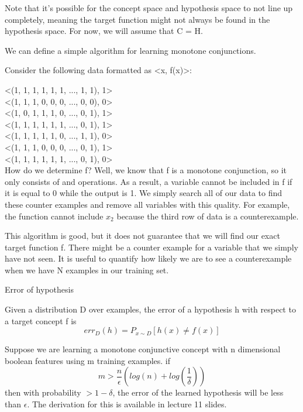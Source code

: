 Note that it's possible for the concept space and hypothesis space to not line up completely, meaning the target function might not always be found in the hypothesis space. For now, we will assume that C = H.

\hr

We can define a simple algorithm for learning monotone conjunctions.

Consider the following data formatted as <x, f(x)>:

<(1, 1, 1, 1, 1, 1, ..., 1, 1), 1> \\
<(1, 1, 1, 0, 0, 0, ..., 0, 0), 0> \\
<(1, 0, 1, 1, 1, 0, ..., 0, 1), 1> \\
<(1, 1, 1, 1, 1, 1, ..., 0, 1), 1> \\
<(1, 1, 1, 1, 1, 0, ..., 1, 1), 0> \\
<(1, 1, 1, 0, 0, 0, ..., 0, 1), 1> \\
<(1, 1, 1, 1, 1, 1, ..., 0, 1), 0> \\

How do we determine f? Well, we know that f is a monotone conjunction, so it only consists of and operations. As a result, a variable cannot be included in f if it is equal to 0 while the output is 1. We simply search all of our data to find these counter examples and remove all variables with this quality. For example, the function cannot include $x_2$ because the third row of data is a counterexample.

This algorithm is good, but it does not guarantee that we will find our exact target function f. There might be a counter example for a variable that we simply have not seen. It is useful to quantify how likely we are to see a counterexample when we have N examples in our training set.

\begin{definition}
    Error of hypothesis

    Given a distribution D over examples, the error of a hypothesis h with respect to a target concept f is 
    \[
        err_D(h) = P_{x \sim D}[h(x) \neq f(x)]
    \]
\end{definition}


Suppose we are learning a monotone conjunctive concept with n dimensional boolean features using m training examples. if
\[
    m > \frac{n}{\epsilon}(log(n) + log(\frac{1}{\delta}))  
\]
then with probability $> 1 - \delta$, the error of the learned hypothesis will be less than $\epsilon$. The derivation for this is available in lecture 11 slides.